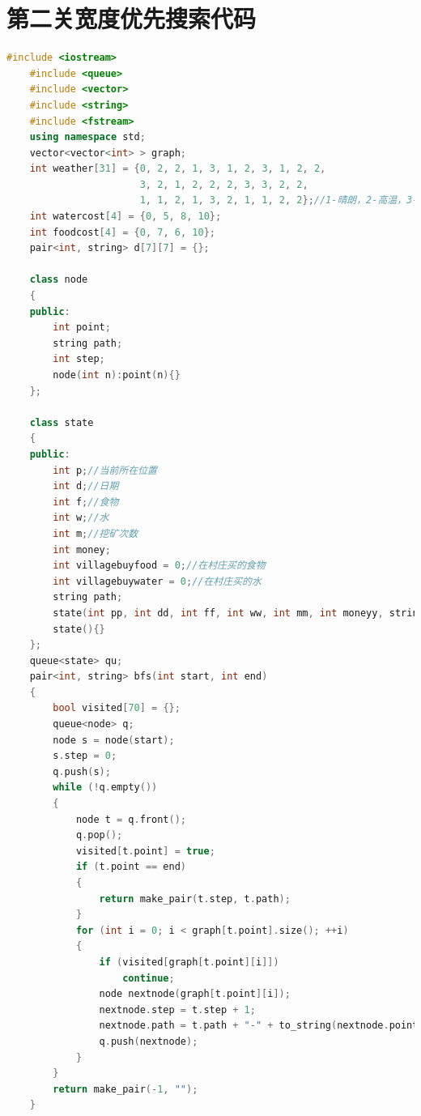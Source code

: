 \documentclass[withoutpreface,bwprint]{cumcmthesis} %
\begin{document}
\begin{appendices}
\begin{lstlisting}[language=c++]
\end{lstlisting}

\section{第二关宽度优先搜索代码}
\begin{lstlisting}[language=c++]
    #include <iostream>
    #include <queue>
    #include <vector>
    #include <string>
    #include <fstream>
    using namespace std;
    vector<vector<int> > graph;
    int weather[31] = {0, 2, 2, 1, 3, 1, 2, 3, 1, 2, 2,
                       3, 2, 1, 2, 2, 2, 3, 3, 2, 2,
                       1, 1, 2, 1, 3, 2, 1, 1, 2, 2};//1-晴朗，2-高温，3-沙暴
    int watercost[4] = {0, 5, 8, 10};
    int foodcost[4] = {0, 7, 6, 10};
    pair<int, string> d[7][7] = {};
    
    class node
    {
    public:
        int point;
        string path;
        int step;
        node(int n):point(n){}
    };
    
    class state
    {
    public:
        int p;//当前所在位置
        int d;//日期
        int f;//食物
        int w;//水
        int m;//挖矿次数
        int money;
        int villagebuyfood = 0;//在村庄买的食物
        int villagebuywater = 0;//在村庄买的水
        string path;
        state(int pp, int dd, int ff, int ww, int mm, int moneyy, string pathh) : p(pp), d(dd), f(ff), w(ww), m(mm), money(moneyy), path(pathh){}
        state(){}
    };
    queue<state> qu;
    pair<int, string> bfs(int start, int end)
    {
        bool visited[70] = {};
        queue<node> q;
        node s = node(start);
        s.step = 0;
        q.push(s);
        while (!q.empty())
        {
            node t = q.front();
            q.pop();
            visited[t.point] = true;
            if (t.point == end)
            {
                return make_pair(t.step, t.path);
            }
            for (int i = 0; i < graph[t.point].size(); ++i)
            {
                if (visited[graph[t.point][i]])
                    continue;
                node nextnode(graph[t.point][i]);
                nextnode.step = t.step + 1;
                nextnode.path = t.path + "-" + to_string(nextnode.point);
                q.push(nextnode);
            }
        }
        return make_pair(-1, "");
    }
    

\end{lstlisting}
\end{appendices}
\end{document}
